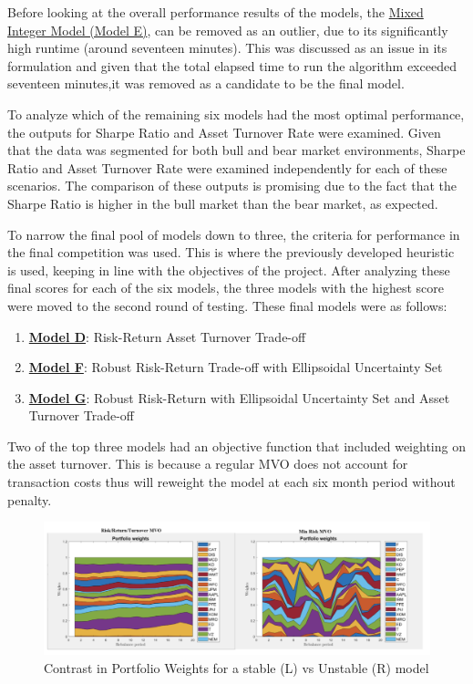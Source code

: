 \documentclass[10pt]{article}
\begin{document}
Before looking at the overall performance results of the models, the \hyperref[sec:modelE]{\color{blue}Mixed Integer Model (Model E)}, can be removed as an outlier, due to its significantly high runtime (around seventeen minutes). This was discussed as an issue in its formulation and  given that the total elapsed time to run the algorithm exceeded seventeen minutes,it was removed as a candidate to be the final model. \bigskip

To analyze which of the remaining six models had the most optimal performance, the outputs for Sharpe Ratio and Asset Turnover Rate were examined. Given that the data was segmented for both bull and bear market environments, Sharpe Ratio and Asset Turnover Rate were examined independently for each of these scenarios. The comparison of these outputs is promising due to the fact that the Sharpe Ratio is higher in the bull market than the bear market, as expected. \bigskip

To narrow the final pool of models down to three, the criteria for performance in the final competition was used. This is where the previously developed heuristic is used, keeping in line with the objectives of the project. After analyzing these final scores for each of the six models, the three models with the highest score were moved to the second round of testing. These final models were as follows:
\begin{enumerate}
\item\hyperref[sec:modelD]{ \textbf{\color{blue}Model D}}: Risk-Return Asset Turnover Trade-off
\item\hyperref[sec:modelF]{ \textbf{\color{blue}Model F}}: Robust Risk-Return Trade-off with Ellipsoidal Uncertainty Set
\item \hyperref[sec:modelG]{ \textbf{\color{blue}Model G}}: Robust Risk-Return with Ellipsoidal Uncertainty Set and Asset Turnover Trade-off
\end{enumerate}
Two of the top three models had an objective function that included weighting on the asset turnover. This is because a regular MVO does not account for transaction costs thus will reweight the model at each six month period without penalty. \bigskip
\begin{figure}[h!]
  \begin{center}
  \includegraphics[scale=0.7]{pics/picture1.png}
    \caption{Contrast in Portfolio Weights for a stable (L) vs Unstable (R) model}
  \end{center}
\end{figure}
\end{document}
